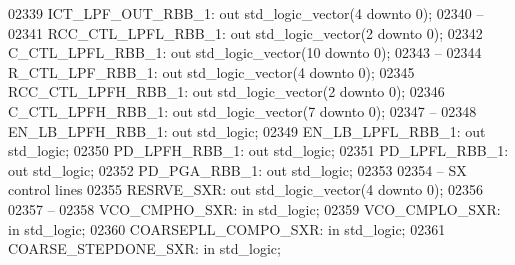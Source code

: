 \begin{DoxyCode}
02339     ICT\_LPF\_OUT\_RBB\_1:  \textcolor{keywordflow}{out} \textcolor{comment}{std\_logic\_vector}(\textcolor{vhdllogic}{}\textcolor{vhdllogic}{4} \textcolor{keywordflow}{downto} \textcolor{vhdllogic}{}\textcolor{vhdllogic}{0});
02340 \textcolor{keyword}{    --}
02341     RCC\_CTL\_LPFL\_RBB\_1: \textcolor{keywordflow}{out} \textcolor{comment}{std\_logic\_vector}(\textcolor{vhdllogic}{}\textcolor{vhdllogic}{2} \textcolor{keywordflow}{downto} \textcolor{vhdllogic}{}\textcolor{vhdllogic}{0});
02342     C\_CTL\_LPFL\_RBB\_1:   \textcolor{keywordflow}{out} \textcolor{comment}{std\_logic\_vector}(\textcolor{vhdllogic}{}\textcolor{vhdllogic}{10} \textcolor{keywordflow}{downto} \textcolor{vhdllogic}{}\textcolor{vhdllogic}{0});
02343 \textcolor{keyword}{    --}
02344     R\_CTL\_LPF\_RBB\_1:    \textcolor{keywordflow}{out} \textcolor{comment}{std\_logic\_vector}(\textcolor{vhdllogic}{}\textcolor{vhdllogic}{4} \textcolor{keywordflow}{downto} \textcolor{vhdllogic}{}\textcolor{vhdllogic}{0});
02345     RCC\_CTL\_LPFH\_RBB\_1: \textcolor{keywordflow}{out} \textcolor{comment}{std\_logic\_vector}(\textcolor{vhdllogic}{}\textcolor{vhdllogic}{2} \textcolor{keywordflow}{downto} \textcolor{vhdllogic}{}\textcolor{vhdllogic}{0});
02346     C\_CTL\_LPFH\_RBB\_1:   \textcolor{keywordflow}{out} \textcolor{comment}{std\_logic\_vector}(\textcolor{vhdllogic}{}\textcolor{vhdllogic}{7} \textcolor{keywordflow}{downto} \textcolor{vhdllogic}{}\textcolor{vhdllogic}{0});
02347 \textcolor{keyword}{    --}
02348     EN\_LB\_LPFH\_RBB\_1:   \textcolor{keywordflow}{out} \textcolor{comment}{std\_logic};
02349     EN\_LB\_LPFL\_RBB\_1:   \textcolor{keywordflow}{out} \textcolor{comment}{std\_logic};
02350     PD\_LPFH\_RBB\_1:  \textcolor{keywordflow}{out} \textcolor{comment}{std\_logic};
02351     PD\_LPFL\_RBB\_1:  \textcolor{keywordflow}{out} \textcolor{comment}{std\_logic};
02352     PD\_PGA\_RBB\_1:   \textcolor{keywordflow}{out} \textcolor{comment}{std\_logic};
02353 
02354 \textcolor{keyword}{    -- SX control lines }
02355     RESRVE\_SXR: \textcolor{keywordflow}{out} \textcolor{comment}{std\_logic\_vector}(\textcolor{vhdllogic}{}\textcolor{vhdllogic}{4} \textcolor{keywordflow}{downto} \textcolor{vhdllogic}{}\textcolor{vhdllogic}{0});
02356 
02357 \textcolor{keyword}{    --}
02358     VCO\_CMPHO\_SXR:      \textcolor{keywordflow}{in} \textcolor{comment}{std\_logic};
02359     VCO\_CMPLO\_SXR:      \textcolor{keywordflow}{in} \textcolor{comment}{std\_logic};
02360     COARSEPLL\_COMPO\_SXR:    \textcolor{keywordflow}{in} \textcolor{comment}{std\_logic};
02361     COARSE\_STEPDONE\_SXR:    \textcolor{keywordflow}{in} \textcolor{comment}{std\_logic};

\end{DoxyCode}
